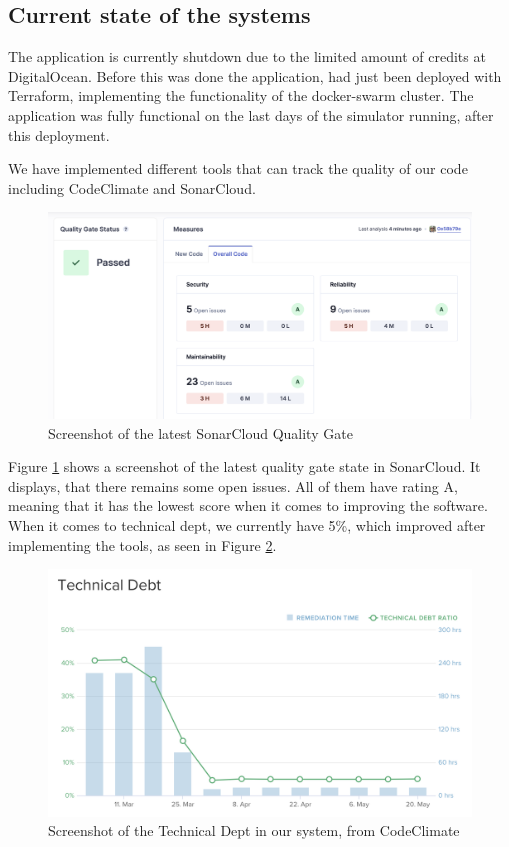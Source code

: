 \subsection{Current state of the systems}
The application is currently shutdown due to the limited amount of credits at DigitalOcean. 
Before this was done the application, had just been deployed with Terraform, implementing the functionality of the docker-swarm cluster. The application was fully functional on the last days of the simulator running, after this deployment.\newline

We have implemented different tools that can track the quality of our code including CodeClimate and SonarCloud.

\begin{figure}[H]
    \centering
    \includegraphics[width=\textwidth]{images/QualityGate.png}
    \caption{Screenshot of the latest SonarCloud Quality Gate}
    \label{img:qualitygate}
\end{figure}

\noindent Figure \ref{img:qualitygate} shows a screenshot of the latest quality gate state in SonarCloud. It displays, that there remains some open issues.  All of them have rating A, meaning that it has the lowest score when it comes to improving the software. \cite{codeclimate} When it comes to technical dept, we currently have 5\%, which improved after implementing the tools, as seen in Figure \ref{img:technical dept}. 

\begin{figure}[H]
    \centering
    \includegraphics[width=\textwidth]{images/Technical Debt.png}
    \caption{Screenshot of the Technical Dept in our system, from CodeClimate}
    \label{img:technical dept}
\end{figure}


